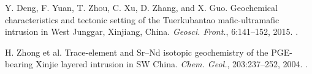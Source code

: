  Y. Deng, F. Yuan, T. Zhou, C. Xu, D. Zhang, and X. Guo. Geochemical characteristics and tectonic setting of the Tuerkubantao mafic-ultramafic intrusion in West Junggar, Xinjiang, China. \textit{Geosci. Front.}, 6:141--152, 2015. .

 H. Zhong et al. Trace-element and Sr--Nd isotopic geochemistry of the PGE-bearing Xinjie layered intrusion in SW China. \textit{Chem. Geol.}, 203:237--252, 2004. .

